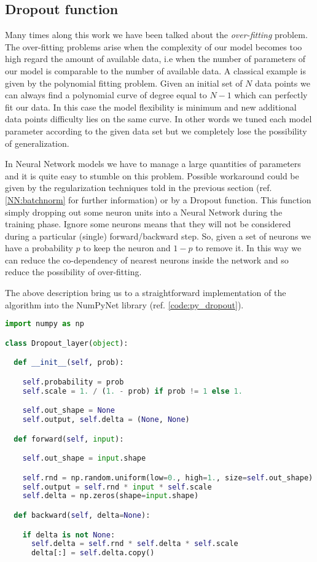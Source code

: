 \documentclass{standalone}
\begin{document}
\subsection[Dropout function]{Dropout function}\label{NN:dropout}

Many times along this work we have been talked about the \emph{over-fitting} problem.
The over-fitting problems arise when the complexity of our model becomes too high regard the amount of available data, i.e when the number of parameters of our model is comparable to the number of available data.
A classical example is given by the polynomial fitting problem.
Given an initial set of $N$ data points we can always find a polynomial curve of degree equal to $N-1$ which can perfectly fit our data.
In this case the model flexibility is minimum and new additional data points difficulty lies on the same curve.
In other words we tuned each model parameter according to the given data set but we completely lose the possibility of generalization.

In Neural Network models we have to manage a large quantities of parameters and it is quite easy to stumble on this problem.
Possible workaround could be given by the regularization techniques told in the previous section (ref. \ref{NN:batchnorm} for further information) or by a Dropout function.
This function simply dropping out some neuron units into a Neural Network during the training phase.
Ignore some neurons means that they will not be considered during a particular (single) forward/backward step.
So, given a set of neurons we have a probability $p$ to keep the neuron and $1-p$ to remove it.
In this way we can reduce the co-dependency of nearest neurons inside the network and so reduce the possibility of over-fitting.

The above description bring us to a straightforward implementation of the algorithm into the \textsf{NumPyNet} library (ref. \ref{code:py_dropout}).

\lstset{style=snippet}
\begin{lstlisting}[language=Python, caption=NumPyNet version of Dropout function, label=code:py_dropout]
import numpy as np

class Dropout_layer(object):

  def __init__(self, prob):

    self.probability = prob
    self.scale = 1. / (1. - prob) if prob != 1 else 1.

    self.out_shape = None
    self.output, self.delta = (None, None)

  def forward(self, input):

    self.out_shape = input.shape

    self.rnd = np.random.uniform(low=0., high=1., size=self.out_shape) < self.probability
    self.output = self.rnd * input * self.scale
    self.delta = np.zeros(shape=input.shape)

  def backward(self, delta=None):

    if delta is not None:
      self.delta = self.rnd * self.delta * self.scale
      delta[:] = self.delta.copy()

\end{lstlisting}
\end{document}
